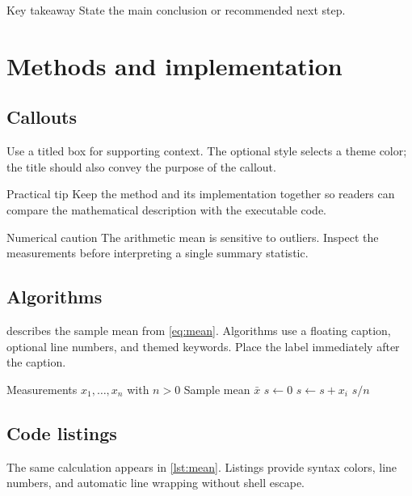 \documentclass[algorithms,listings]{tempusreport}
\begin{document}
\begin{reportbox}{Key takeaway}
State the main conclusion or recommended next step.
\end{reportbox}

\section{Methods and implementation}
\label{sec:methods}

\subsection{Callouts}
Use a titled box for supporting context. The optional style selects a
theme color; the title should also convey the purpose of the callout.

\begin{reportbox}{Practical tip}
Keep the method and its implementation together so readers can compare
the mathematical description with the executable code.
\end{reportbox}

\begin{reportbox}{Numerical caution}
The arithmetic mean is sensitive to outliers. Inspect the measurements
before interpreting a single summary statistic.
\end{reportbox}

\subsection{Algorithms}
 describes the sample mean from \cref{eq:mean}.
Algorithms use a floating caption, optional line numbers, and themed
keywords. Place the label immediately after the caption.

\begin{algorithm}[htbp]
  \caption{Compute the sample mean.}
  \label{alg:mean}
  \begin{algorithmic}[1]
    \Require Measurements $x_1,\ldots,x_n$ with $n > 0$
    \Ensure Sample mean $\bar{x}$
    \State $s \gets 0$ 
      \State $s \gets s + x_i$
    \EndFor
    \State \Return $s/n$
  \end{algorithmic}
\end{algorithm}

\subsection{Code listings}
The same calculation appears in \cref{lst:mean}. Listings provide syntax
colors, line numbers, and automatic line wrapping without shell escape.
\end{document}
